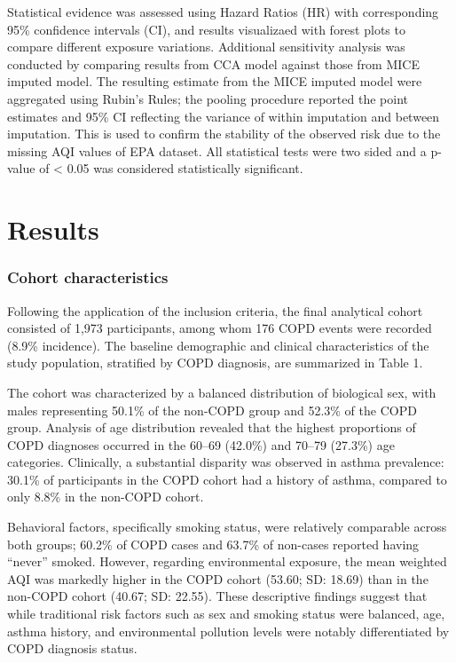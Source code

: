 \documentclass[
]{article}
\begin{document}
Statistical evidence was assessed using Hazard Ratios (HR) with
corresponding 95\% confidence intervals (CI), and results visualizaed
with forest plots to compare different exposure variations. Additional
sensitivity analysis was conducted by comparing results from CCA model
against those from MICE imputed model. The resulting estimate from the
MICE imputed model were aggregated using Rubin's Rules; the pooling
procedure reported the point estimates and 95\% CI reflecting the
variance of within imputation and between imputation. This is used to
confirm the stability of the observed risk due to the missing AQI values
of EPA dataset. All statistical tests were two sided and a p-value of
\textless{} 0.05 was considered statistically significant.

\section{Results}\label{results}

\subsubsection{Cohort characteristics}\label{cohort-characteristics}

Following the application of the inclusion criteria, the final
analytical cohort consisted of 1,973 participants, among whom 176 COPD
events were recorded (8.9\% incidence). The baseline demographic and
clinical characteristics of the study population, stratified by COPD
diagnosis, are summarized in Table 1.

The cohort was characterized by a balanced distribution of biological
sex, with males representing 50.1\% of the non-COPD group and 52.3\% of
the COPD group. Analysis of age distribution revealed that the highest
proportions of COPD diagnoses occurred in the 60--69 (42.0\%) and 70--79
(27.3\%) age categories. Clinically, a substantial disparity was
observed in asthma prevalence: 30.1\% of participants in the COPD cohort
had a history of asthma, compared to only 8.8\% in the non-COPD cohort.

Behavioral factors, specifically smoking status, were relatively
comparable across both groups; 60.2\% of COPD cases and 63.7\% of
non-cases reported having ``never'' smoked. However, regarding
environmental exposure, the mean weighted AQI was markedly higher in the
COPD cohort (53.60; SD: 18.69) than in the non-COPD cohort (40.67; SD:
22.55). These descriptive findings suggest that while traditional risk
factors such as sex and smoking status were balanced, age, asthma
history, and environmental pollution levels were notably differentiated
by COPD diagnosis status.
\end{document}
